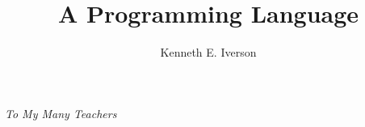\documentclass{book}
\title{A Programming Language}
\author{Kenneth E. Iverson}
\date{}
\begin{document}
\maketitle

\clearpage
\begin{center}
    \thispagestyle{empty}
    \vspace*{\fill}
    \textit{To My Many Teachers}
    \vspace*{\fill}
\end{center}
\clearpage


\end{document}
